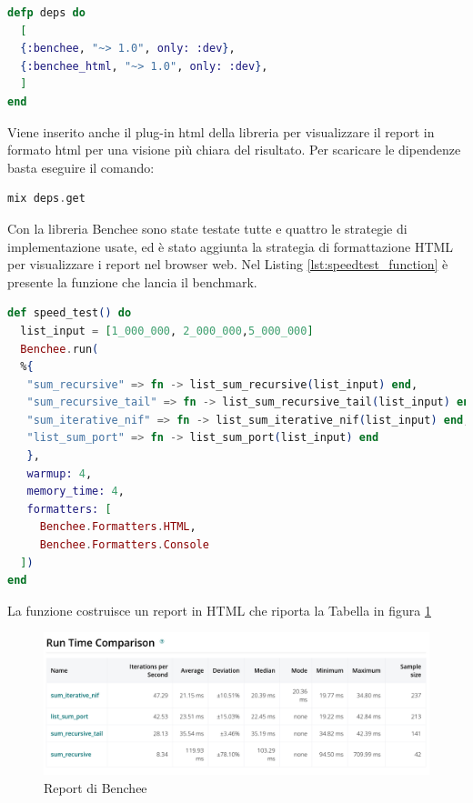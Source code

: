 \begin{lstlisting}[language=elixir,captionpos=b,
	caption={Dipendenze di Benchee},
	label={lst:benchee_dependencies}]
defp deps do
  [
  {:benchee, "~> 1.0", only: :dev},     
  {:benchee_html, "~> 1.0", only: :dev},
  ]
end
\end{lstlisting}

Viene inserito anche il plug-in html della libreria
per visualizzare il report in formato html per
una visione più chiara del risultato.
Per scaricare le dipendenze basta eseguire il comando:

\begin{lstlisting}[language=elixir]
mix deps.get
\end{lstlisting}


Con la libreria Benchee sono state testate tutte e quattro le
strategie di implementazione usate, ed è stato aggiunta la strategia
di formattazione HTML per visualizzare
i report nel browser web.
Nel Listing \ref{lst:speedtest_function}
è presente la funzione che lancia il benchmark.
 

\begin{lstlisting}[language=elixir,captionpos=b,
	caption={Funzione speed\_test()},
	label={lst:speedtest_function}]
def speed_test() do
  list_input = [1_000_000, 2_000_000,5_000_000]
  Benchee.run(
  %{
   "sum_recursive" => fn -> list_sum_recursive(list_input) end,
   "sum_recursive_tail" => fn -> list_sum_recursive_tail(list_input) end,
   "sum_iterative_nif" => fn -> list_sum_iterative_nif(list_input) end,
   "list_sum_port" => fn -> list_sum_port(list_input) end
   },
   warmup: 4,
   memory_time: 4,
   formatters: [
     Benchee.Formatters.HTML,
     Benchee.Formatters.Console
  ])
end
\end{lstlisting}

\newpage
La funzione costruisce un report in HTML che riporta la Tabella
in figura \ref{fig:report_tab_interoperabilita}

\begin{figure}[!htp]
    \centering
    \includegraphics[keepaspectratio=true,scale=0.21]{images/tab_report.png}
	\caption{Report di Benchee}
  	\label{fig:report_tab_interoperabilita}
\end{figure}

